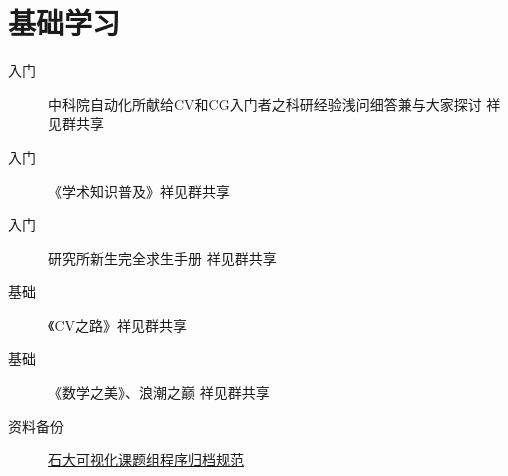 \documentclass[a4paper，12pt]{article}
\begin{document}
\section{基础学习}

\begin{description}

\item[入门]中科院自动化所献给CV和CG入门者之科研经验浅问细答兼与大家探讨 祥见群共享

\item[入门]《学术知识普及》祥见群共享

\item[入门] 研究所新生完全求生手册 祥见群共享

\item[基础]《CV之路》祥见群共享

\item[基础]《数学之美》、浪潮之巅 祥见群共享



\item[资料备份] \href{https://github.com/imistyrain/UPCRules}{石大可视化课题组程序归档规范}

\end{description}
\end{document}

